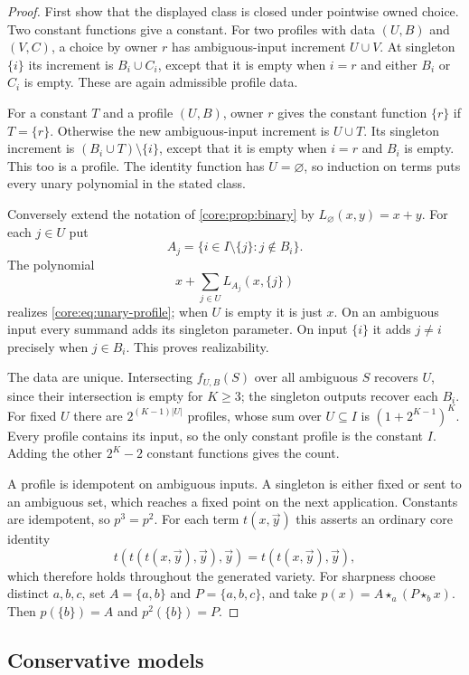 \begin{proof}
First show that the displayed class is closed under pointwise owned
choice. Two constant functions give a constant. For two profiles with
data $(U,B)$ and $(V,C)$, a choice by owner $r$ has ambiguous-input
increment $U\cup V$. At singleton $\{i\}$ its increment is
$B_i\cup C_i$, except that it is empty when $i=r$ and either
$B_i$ or $C_i$ is empty. These are again admissible profile data.

For a constant $T$ and a profile $(U,B)$, owner $r$ gives the constant
function $\{r\}$ if $T=\{r\}$. Otherwise the new ambiguous-input
increment is $U\cup T$. Its singleton increment is
$(B_i\cup T)\setminus\{i\}$, except that it is empty when $i=r$
and $B_i$ is empty. This too is a profile. The identity function
has $U=\varnothing$, so induction on terms puts every unary
polynomial in the stated class.

Conversely extend the notation of \cref{core:prop:binary} by
$L_\varnothing(x,y)=x+y$. For each $j\in U$ put
\[
 A_j=\{i\in I\setminus\{j\}:j\notin B_i\}.
\]
The polynomial
\[
 x+\sum_{j\in U} L_{A_j}(x,\{j\})
\]
realizes \eqref{core:eq:unary-profile}; when $U$ is empty it is
just $x$. On an ambiguous input every summand adds its singleton
parameter. On input $\{i\}$ it adds $j\ne i$ precisely when
$j\in B_i$. This proves realizability.

The data are unique. Intersecting $f_{U,B}(S)$ over all ambiguous
$S$ recovers $U$, since their intersection is empty for $K\geq3$;
the singleton outputs recover each $B_i$. For fixed $U$ there are
$2^{(K-1)|U|}$ profiles, whose sum over $U\subseteq I$ is
$(1+2^{K-1})^K$. Every profile contains its input, so the only
constant profile is the constant $I$. Adding the other $2^K-2$
constant functions gives the count.

A profile is idempotent on ambiguous inputs. A singleton is either
fixed or sent to an ambiguous set, which reaches a fixed point on
the next application. Constants are idempotent, so $p^3=p^2$.
For each term $t(x,\vec y)$ this asserts an ordinary core identity
\[
 t(t(t(x,\vec y),\vec y),\vec y)
   =t(t(x,\vec y),\vec y),
\]
which therefore holds throughout the generated variety. For
sharpness choose distinct $a,b,c$, set $A=\{a,b\}$ and
$P=\{a,b,c\}$, and take
$p(x)=A\star_a(P\star_b x)$. Then $p(\{b\})=A$ and
$p^2(\{b\})=P$.
\end{proof}

\subsection{Conservative models}
\label{app:core-conservative}

